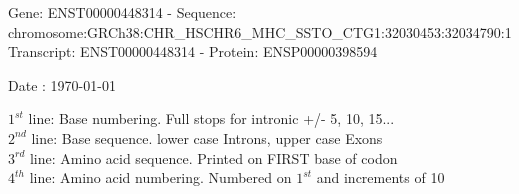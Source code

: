 \documentclass{article}
\begin{document}
\begin{center}
\begin{large}
Gene: ENST00000448314 - Sequence: chromosome:GRCh38:CHR\_HSCHR6\_MHC\_SSTO\_CTG1:32030453:32034790:1\\
Transcript: ENST00000448314 - Protein: ENSP00000398594
 
 Date : \today
\end{large}
\end{center}
$1^{st}$ line: Base numbering. Full stops for intronic +/- 5, 10, 15...\\
$2^{nd}$ line: Base sequence. lower case Introns, upper case Exons\\
$3^{rd}$ line: Amino acid sequence. Printed on FIRST base of codon\\
$4^{th}$ line: Amino acid numbering. Numbered on $1^{st}$ and increments of 10\\
\end{document}
